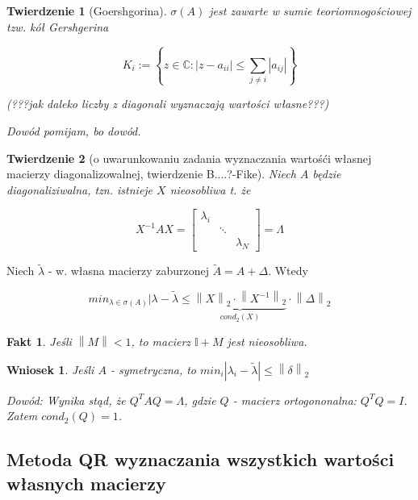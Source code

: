 \documentclass[hidelinks,a4paper]{article}
\newcommand{\II}{\mathbb{I}}
\newcommand{\CC}{\mathbb{C}}
\newcommand{\norm}[1]{\left\lVert#1\right\rVert}
\newtheorem{wniosek}{Wniosek}
\newtheorem{fakt}{Fakt}
\newtheorem{twierdz}{Twierdzenie}
\begin{document}
\begin{twierdz}[Goershgorina] $\sigma(A)$ jest zawarte w sumie teoriomnogościowej tzw. kół Gershgerina
	
	\[
		K_{i} := \left\{ z \in \CC: |z - a_{ii} | \leq \sum_{j \neq i} |a_{ij}| \right\}
	\]
	
	(???jak daleko liczby z diagonali wyznaczają wartości własne???)
	
	
	Dowód pomijam, bo dowód.
	
\end{twierdz}

\begin{twierdz}[o uwarunkowaniu zadania wyznaczania wartośći własnej macierzy diagonalizowalnej, twierdzenie B....?-Fike]
	Niech $A$ będzie diagonaliziwalna, tzn. istnieje $X$ nieosobliwa t. że
	
	\[
		X^{-1}AX = \left[ \begin{array}{ccc} \lambda_i & & \\ & \ddots \\ & & \lambda_N \end{array} \right] = \Lambda
	\]
\end{twierdz}

Niech $\tilde{\lambda}$ - w. własna macierzy zaburzonej $\tilde{A} = A + \Delta$. Wtedy

\[
	min_{\lambda \in \sigma(A)} |\lambda - \tilde{\lambda} \leq \underbrace{\norm{X} _2 \cdot \norm{X^{-1}}_2}_{cond_2(X)} \cdot \norm{\Delta}_2
\]

\begin{fakt}Jeśli $\norm{M} < 1$, to macierz $\II+M$ jest nieosobliwa.
\end{fakt}

\begin{wniosek}
	Jeśli $A$ - symetryczna, to $min_i |\lambda_i - \tilde{\lambda}| \leq \norm{\delta}_2$
	
	Dowód: Wynika stąd, że $Q^TAQ = \Lambda$, gdzie $Q$ - macierz ortogononalna: $Q^TQ = I$. Zatem $cond_2(Q) = 1$.
\end{wniosek}

\subsection{Metoda QR wyznaczania wszystkich wartości własnych macierzy}
\end{document}

